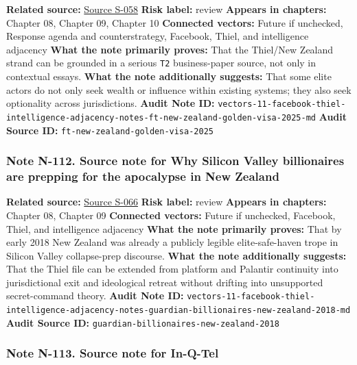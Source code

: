 \documentclass[
  american,
  11pt,
  letterpaper,
]{article}
\begin{document}
\textbf{Related source:}
\hyperref[source-s-058-new-zealand-woos-the-wealthy-with-golden-visa-changes]{Source
S-058} \textbf{Risk label:} review \textbf{Appears in chapters:} Chapter
08, Chapter 09, Chapter 10 \textbf{Connected vectors:} Future if
unchecked, Response agenda and counterstrategy, Facebook, Thiel, and
intelligence adjacency \textbf{What the note primarily proves:} That the
Thiel/New Zealand strand can be grounded in a serious \texttt{T2}
business-paper source, not only in contextual essays. \textbf{What the
note additionally suggests:} That some elite actors do not only seek
wealth or influence within existing systems; they also seek optionality
across jurisdictions. \textbf{Audit Note ID:}
\texttt{vectors-11-facebook-thiel-intelligence-adjacency-notes-ft-new-zealand-golden-visa-2025-md}
\textbf{Audit Source ID:} \texttt{ft-new-zealand-golden-visa-2025}

\subsubsection{Note N-112. Source note for Why Silicon Valley
billionaires are prepping for the apocalypse in New
Zealand}\label{note-n-112-vectors-11-facebook-thiel-intelligence-adjacency-notes-guardian-billionaires-new-zealand-2018-md}

\textbf{Related source:}
\hyperref[source-s-066-why-silicon-valley-billionaires-are-prepping-for-the-apocalypse-in-new-zealand]{Source
S-066} \textbf{Risk label:} review \textbf{Appears in chapters:} Chapter
08, Chapter 09 \textbf{Connected vectors:} Future if unchecked,
Facebook, Thiel, and intelligence adjacency \textbf{What the note
primarily proves:} That by early 2018 New Zealand was already a publicly
legible elite-safe-haven trope in Silicon Valley collapse-prep
discourse. \textbf{What the note additionally suggests:} That the Thiel
file can be extended from platform and Palantir continuity into
jurisdictional exit and ideological retreat without drifting into
unsupported secret-command theory. \textbf{Audit Note ID:}
\texttt{vectors-11-facebook-thiel-intelligence-adjacency-notes-guardian-billionaires-new-zealand-2018-md}
\textbf{Audit Source ID:}
\texttt{guardian-billionaires-new-zealand-2018}

\subsubsection{Note N-113. Source note for
In-Q-Tel}\label{note-n-113-vectors-11-facebook-thiel-intelligence-adjacency-notes-iqt-homepage-2026-md}
\end{document}
